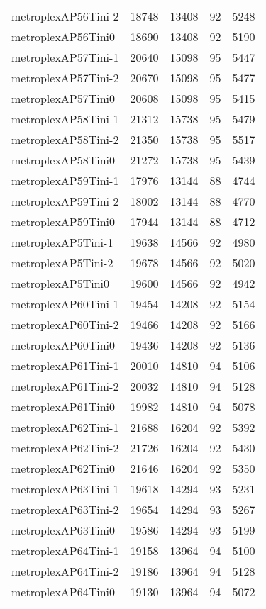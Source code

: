 \begin{tabular}{lrrrr}
metroplexAP56Tini-2 & 18748 & 13408 & 92 & 5248 \\
metroplexAP56Tini0 & 18690 & 13408 & 92 & 5190 \\
metroplexAP57Tini-1 & 20640 & 15098 & 95 & 5447 \\
metroplexAP57Tini-2 & 20670 & 15098 & 95 & 5477 \\
metroplexAP57Tini0 & 20608 & 15098 & 95 & 5415 \\
metroplexAP58Tini-1 & 21312 & 15738 & 95 & 5479 \\
metroplexAP58Tini-2 & 21350 & 15738 & 95 & 5517 \\
metroplexAP58Tini0 & 21272 & 15738 & 95 & 5439 \\
metroplexAP59Tini-1 & 17976 & 13144 & 88 & 4744 \\
metroplexAP59Tini-2 & 18002 & 13144 & 88 & 4770 \\
metroplexAP59Tini0 & 17944 & 13144 & 88 & 4712 \\
metroplexAP5Tini-1 & 19638 & 14566 & 92 & 4980 \\
metroplexAP5Tini-2 & 19678 & 14566 & 92 & 5020 \\
metroplexAP5Tini0 & 19600 & 14566 & 92 & 4942 \\
metroplexAP60Tini-1 & 19454 & 14208 & 92 & 5154 \\
metroplexAP60Tini-2 & 19466 & 14208 & 92 & 5166 \\
metroplexAP60Tini0 & 19436 & 14208 & 92 & 5136 \\
metroplexAP61Tini-1 & 20010 & 14810 & 94 & 5106 \\
metroplexAP61Tini-2 & 20032 & 14810 & 94 & 5128 \\
metroplexAP61Tini0 & 19982 & 14810 & 94 & 5078 \\
metroplexAP62Tini-1 & 21688 & 16204 & 92 & 5392 \\
metroplexAP62Tini-2 & 21726 & 16204 & 92 & 5430 \\
metroplexAP62Tini0 & 21646 & 16204 & 92 & 5350 \\
metroplexAP63Tini-1 & 19618 & 14294 & 93 & 5231 \\
metroplexAP63Tini-2 & 19654 & 14294 & 93 & 5267 \\
metroplexAP63Tini0 & 19586 & 14294 & 93 & 5199 \\
metroplexAP64Tini-1 & 19158 & 13964 & 94 & 5100 \\
metroplexAP64Tini-2 & 19186 & 13964 & 94 & 5128 \\
metroplexAP64Tini0 & 19130 & 13964 & 94 & 5072 \\

\end{tabular}
